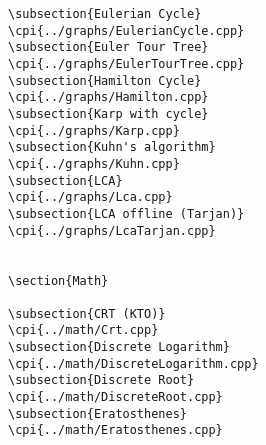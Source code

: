 {\begin{verbatim}
\subsection{Eulerian Cycle}
\cpi{../graphs/EulerianCycle.cpp}
\subsection{Euler Tour Tree}
\cpi{../graphs/EulerTourTree.cpp}
\subsection{Hamilton Cycle}
\cpi{../graphs/Hamilton.cpp}
\subsection{Karp with cycle}
\cpi{../graphs/Karp.cpp}
\subsection{Kuhn's algorithm}
\cpi{../graphs/Kuhn.cpp}
\subsection{LCA}
\cpi{../graphs/Lca.cpp}
\subsection{LCA offline (Tarjan)}
\cpi{../graphs/LcaTarjan.cpp}


\section{Math}

\subsection{CRT (KTO)}
\cpi{../math/Crt.cpp}
\subsection{Discrete Logarithm}
\cpi{../math/DiscreteLogarithm.cpp}
\subsection{Discrete Root}
\cpi{../math/DiscreteRoot.cpp}
\subsection{Eratosthenes}
\cpi{../math/Eratosthenes.cpp}

\end{verbatim}}
